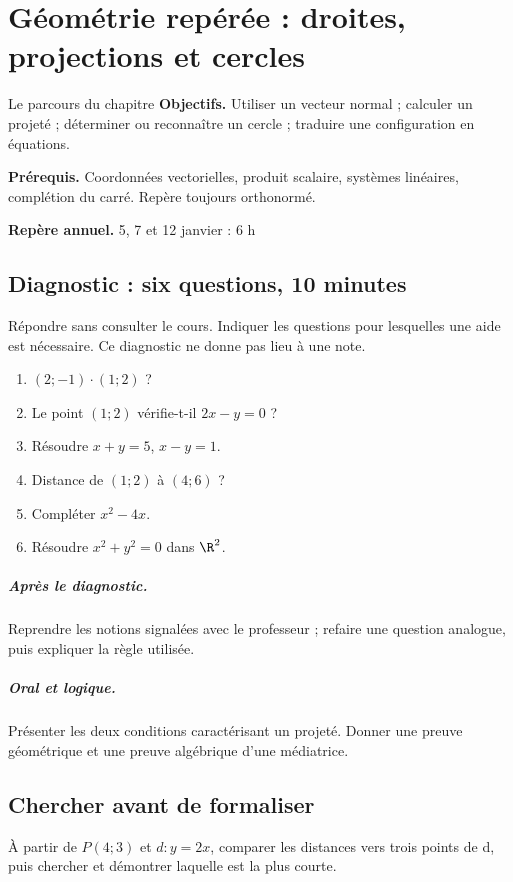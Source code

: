 \chapter{Géométrie repérée : droites, projections et cercles}\label{C07}
\begin{repere}{Le parcours du chapitre}
\textbf{Objectifs.} Utiliser un vecteur normal ; calculer un projeté ; déterminer ou reconnaître un cercle ; traduire une configuration en équations.

\textbf{Prérequis.} Coordonnées vectorielles, produit scalaire, systèmes linéaires, complétion du carré. Repère toujours orthonormé.

\textbf{Repère annuel.} 5, 7 et 12 janvier : 6 h\end{repere}
\section*{Diagnostic : six questions, 10 minutes}\label{C07-D}
Répondre sans consulter le cours. Indiquer les questions pour lesquelles une aide est nécessaire. Ce diagnostic ne donne pas lieu à une note.
\begin{enumerate}
\item $(2;-1)\cdot(1;2)$ ?
\item Le point $(1;2)$ vérifie-t-il $2x-y=0$ ?
\item Résoudre $x+y=5$, $x-y=1$.
\item Distance de $(1;2)$ à $(4;6)$ ?
\item Compléter $x^2-4x$.
\item Résoudre $x^2+y^2=0$ dans $\R^2$.
\end{enumerate}
\paragraph{Après le diagnostic.} Reprendre les notions signalées avec le professeur ; refaire une question analogue, puis expliquer la règle utilisée.
\paragraph{Oral et logique.} Présenter les deux conditions caractérisant un projeté. Donner une preuve géométrique et une preuve algébrique d’une médiatrice.
\clearpage
\section*{Chercher avant de formaliser}\label{C07-RECH}
À partir de $P(4;3)$ et $d:y=2x$, comparer les distances vers trois points de d, puis chercher et démontrer laquelle est la plus courte.
